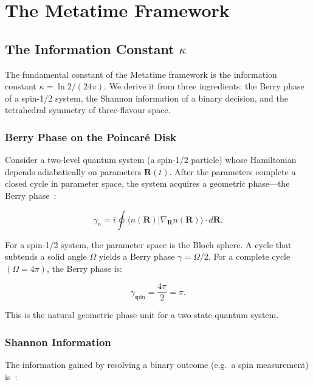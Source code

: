 \chapter{The Metatime Framework}
\label{ch:metatime_framework}

\section{The Information Constant \(\kappa\)}

The fundamental constant of the Metatime framework is the information
constant \(\kappa = \ln 2 / (24\pi)\).  We derive it from three ingredients:
the Berry phase of a spin-1/2 system, the Shannon information of a binary
decision, and the tetrahedral symmetry of three-flavour space.

\subsection{Berry Phase on the Poincar\'{e} Disk}

Consider a two-level quantum system (a spin-1/2 particle) whose Hamiltonian
depends adiabatically on parameters \(\mathbf{R}(t)\).  After the parameters
complete a closed cycle in parameter space, the system acquires a geometric
phase---the Berry phase~\cite{berry1984}:

\begin{equation}
\gamma_n = i \oint \langle n(\mathbf{R}) | \nabla_{\mathbf{R}} n(\mathbf{R}) \rangle \cdot d\mathbf{R}.
\label{eq:berry_general}
\end{equation}

For a spin-1/2 system, the parameter space is the Bloch sphere.
A cycle that subtends a solid angle \(\Omega\) yields a Berry phase
\(\gamma = \Omega/2\).  For a complete cycle \((\Omega = 4\pi)\), the Berry
phase is:

\begin{equation}
\gamma_{\text{spin}} = \frac{4\pi}{2} = \pi.
\label{eq:berry_spin_half}
\end{equation}

This is the natural geometric phase unit for a two-state quantum system.

\subsection{Shannon Information}

The information gained by resolving a binary outcome (e.g.\ a spin
measurement) is~\cite{shannon1948}:


